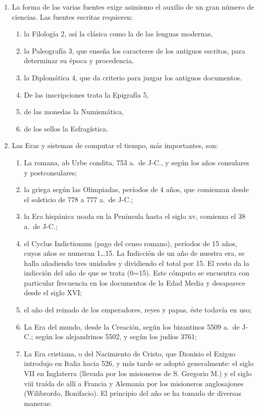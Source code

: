 \raggedbottom{} \documentclass[12pt, a4paper]{book}
\begin{document}
\begin{enumerate}
\begin{enumerate}
        \end{enumerate}
  \item La forma de las varias fuentes exige asimismo el auxilio de un gran número de ciencias. Las fuentes escritas requieren:\@ \begin{enumerate}
          \item la Filología 2, así la clásica como la de las lenguas modernas,
          \item la Paleografía 3, que enseña los caracteres de los antiguos escritos, para determinar su época y procedencia,
          \item la Diplomática 4, que da criterio para juzgar los antiguos documentos.
          \item De las inscripciones trata la Epigrafía 5,
          \item de las monedas la Numismática,
          \item de los sellos la Esfragística.
        \end{enumerate}
  \item Las Eras y sistemas de computar el tiempo, más importantes, son:\@ \begin{enumerate}
          \item La romana, ab Urbe condita, 753 a.\ de J-C., y según los años consulares y postconsulares;
          \item la griega según las Olimpiadas, períodos de 4 años, que comienzan desde el solsticio de 778 a 777 a.\ de J-C.;
          \item la Era hispánica usada en la Península hasta el siglo xv, comienza el 38 a.\ de J-C.;
          \item el Cyclus Indictionum (pago del censo romano), períodos de 15 años, cuyos años se numeran 1\ldots 15. La Indicción de un año de nuestra era, se halla añadiendo tres unidades y dividiendo el total por 15. El resto da la indicción del año de que se trata (0=15). Este cómputo se encuentra con particular frecuencia en los documentos de la Edad Media y desaparece desde el siglo XVI;\@
          \item el año del reinado de los emperadores, reyes y papas, éste todavía en uso;
          \item La Era del mundo, desde la Creación, según los bizantinos 5509 a.\ de J-C.; según los alejandrinos 5502, y según los judíos 3761;
          \item La Era cristiana, o del Nacimiento de Cristo, que Dionisio el Exiguo introdujo en Italia hacia 526, y más tarde se adoptó generalmente: el siglo VII en Inglaterra (llevada por los misioneros de S. Gregorio M.) y el siglo viii traída de allí a Francia y Alemania por los misioneros anglosajones (Wilibrordo, Bonifacio). El principio del año se ha tomado de diversas maneras: \begin{enumerate}

\end{enumerate}
\end{enumerate}
\end{enumerate}
\end{document}
